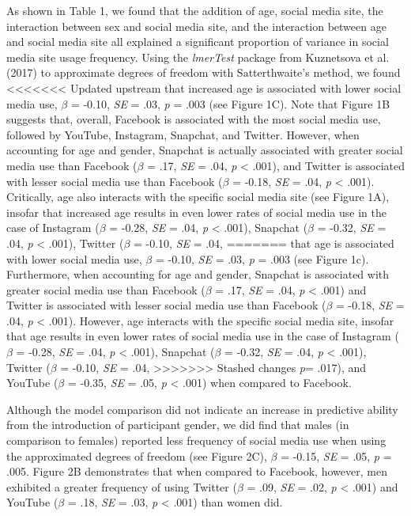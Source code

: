 \documentclass[man, fleqn, noextraspace]{apa6}
\theoremstyle{definition}
\theoremstyle{definition}
\theoremstyle{definition}
\theoremstyle{remark}
\begin{document}
As shown in Table 1, we found that the addition of age, social media
site, the interaction between sex and social media site, and the
interaction between age and social media site all explained a
significant proportion of variance in social media site usage frequency.
Using the \emph{lmerTest} package from Kuznetsova et al. (2017) to
approximate degrees of freedom with Satterthwaite's method, we found
<<<<<<< Updated upstream
that increased age is associated with lower social media use, \(\beta\)
= -0.10, \emph{SE} = .03, \emph{p} = .003 (see Figure 1C). Note that
Figure 1B suggests that, overall, Facebook is associated with the most
social media use, followed by YouTube, Instagram, Snapchat, and Twitter.
However, when accounting for age and gender, Snapchat is actually
associated with greater social media use than Facebook (\(\beta\) = .17,
\emph{SE} = .04, \emph{p} \textless{} .001), and Twitter is associated
with lesser social media use than Facebook (\(\beta\) = -0.18, \emph{SE}
= .04, \emph{p} \textless{} .001). Critically, age also interacts with
the specific social media site (see Figure 1A), insofar that increased
age results in even lower rates of social media use in the case of
Instagram (\(\beta\) = -0.28, \emph{SE} = .04, \emph{p} \textless{}
.001), Snapchat (\(\beta\) = -0.32, \emph{SE} = .04, \emph{p}
\textless{} .001), Twitter (\(\beta\) = -0.10, \emph{SE} = .04,
=======
that age is associated with lower social media use, \(\beta\) = -0.10,
\emph{SE} = .03, \emph{p} = .003 (see Figure 1c). Furthermore, when
accounting for age and gender, Snapchat is associated with greater
social media use than Facebook (\(\beta\) = .17, \emph{SE} = .04,
\emph{p} \textless{} .001) and Twitter is associated with lesser social
media use than Facebook (\(\beta\) = -0.18, \emph{SE} = .04, \emph{p}
\textless{} .001). However, age interacts with the specific social media
site, insofar that age results in even lower rates of social media use
in the case of Instagram (\(\beta\) = -0.28, \emph{SE} = .04, \emph{p}
\textless{} .001), Snapchat (\(\beta\) = -0.32, \emph{SE} = .04,
\emph{p} \textless{} .001), Twitter (\(\beta\) = -0.10, \emph{SE} = .04,
>>>>>>> Stashed changes
\emph{p}= .017), and YouTube (\(\beta\) = -0.35, \emph{SE} = .05,
\emph{p} \textless{} .001) when compared to Facebook.

Although the model comparison did not indicate an increase in predictive
ability from the introduction of participant gender, we did find that
males (in comparison to females) reported less frequency of social media
use when using the approximated degrees of freedom (see Figure 2C),
\(\beta\) = -0.15, \emph{SE} = .05, \emph{p} = .005. Figure 2B
demonstrates that when compared to Facebook, however, men exhibited a
greater frequency of using Twitter (\(\beta\) = .09, \emph{SE} = .02,
\emph{p} \textless{} .001) and YouTube (\(\beta\) = .18, \emph{SE} =
.03, \emph{p} \textless{} .001) than women did.
\end{document}
